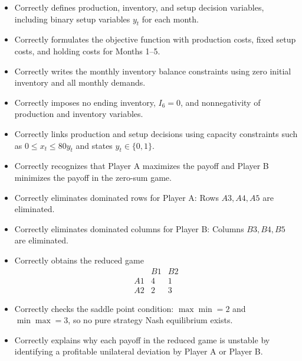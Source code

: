 
\begin{itemize}
    \item Correctly defines production, inventory, and setup decision variables,
    including binary setup variables $y_t$ for each month. 

    \item Correctly formulates the objective function with production costs, fixed
    setup costs, and holding costs for Months 1--5. 

    \item Correctly writes the monthly inventory balance constraints using zero initial
    inventory and all monthly demands. 

    \item Correctly imposes no ending inventory, $I_6=0$, and nonnegativity of production
    and inventory variables. 

    \item Correctly links production and setup decisions using capacity constraints
    such as $0\leq x_t\leq 80y_t$ and states $y_t\in\{0,1\}$. 
\end{itemize}



\begin{itemize}
    \item Correctly recognizes that Player A maximizes the payoff and Player B minimizes
    the payoff in the zero-sum game. 

    \item Correctly eliminates dominated rows for Player A:
    Rows $A3,A4,A5$ are eliminated. 

    \item Correctly eliminates dominated columns for Player B:
    Columns $B3,B4,B5$ are eliminated. 

    \item Correctly obtains the reduced game
    \[
    \begin{array}{c|cc}
     & B1 & B2\\
    \hline
    A1 & 4 & 1\\
    A2 & 2 & 3
    \end{array}
    \]

    \item Correctly checks the saddle point condition:
    $\max\min=2$ and $\min\max=3$, so no pure strategy Nash equilibrium exists.

    \item Correctly explains why each payoff in the reduced game is unstable by
    identifying a profitable unilateral deviation by Player A or Player B. 
\end{itemize}


